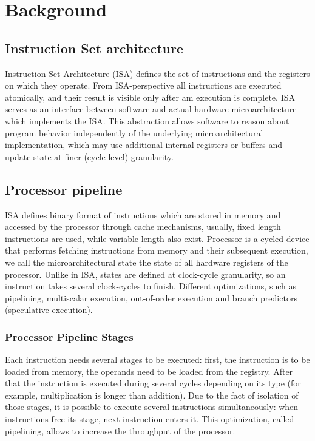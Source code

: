 \chapter{Background}

\section{Instruction Set architecture}


Instruction Set Architecture (ISA) defines the set of instructions and the registers on which they operate. From ISA-perspective all instructions are executed atomically, and their result is visible only after am execution is complete. ISA serves as an interface between software and actual hardware microarchitecture which implements the ISA. This abstraction allows software to reason about program behavior independently of the underlying microarchitectural implementation, which may use additional internal registers or buffers and update state at finer (cycle-level) granularity.


\section{Processor pipeline}

ISA defines binary format of instructions which are stored in memory and accessed by the processor through cache mechanisms, usually, fixed length instructions are used, while variable-length also exist. Processor is a cycled device that performs fetching instructions from memory and their subsequent execution, we call the microarchitectural state the state of all hardware registers of the processor. Unlike in ISA, states are defined at clock-cycle granularity, so an instruction takes several clock-cycles to finish. Different optimizations, such as pipelining, multiscalar execution, out-of-order execution and branch predictors (speculative execution).

\subsection{Processor Pipeline Stages}

Each instruction needs several stages to be executed: first, the instruction is to be loaded from memory, the operands need to be loaded from the registry. After that the instruction is executed during several cycles depending on its type (for example, multiplication is longer than addition). Due to the fact of isolation of those stages, it is possible to execute several instructions simultaneously: when instructions free its stage, next instruction enters it. This optimization, called pipelining, allows to increase the throughput of the processor.

